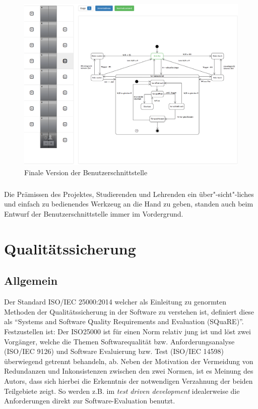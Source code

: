 \begin{figure}[h]
	\hspace*{-1.5cm}
	\includegraphics[width=1.15\textwidth]{images/UI_colorless}
	\caption{Finale Version der Benutzerschnittstelle}
	\label{UI_final}
\end{figure}

\paragraph{}
Die Prämissen des Projektes, Studierenden und Lehrenden ein über"-sicht"-liches und einfach zu bedienendes Werkzeug an die Hand zu geben, standen auch beim Entwurf der Benutzerschnittstelle immer im Vordergrund.


\chapter{Qualitätssicherung}
\label{QS}
\section{Allgemein} \label{QS:Allgemein}
Der Standard ISO/IEC 25000:2014 welcher als Einleitung zu genormten Methoden der Qualitätssicherung in der Software zu verstehen ist, definiert diese als "`Systems and Software Quality Requirements and Evaluation (SQuaRE)"'\cite[Foreword]{ISO25000:2014}. Festzustellen ist: Der ISO25000 ist für einen Norm relativ jung ist und löst zwei Vorgänger, welche die Themen Softwarequalität bzw. Anforderungsanalyse (ISO/IEC 9126) und Software Evaluierung bzw. Test (ISO/IEC 14598) überwiegend getrennt behandeln, ab. Neben der Motivation der Vermeidung von Redundanzen und Inkonsistenzen zwischen den zwei Normen, ist es Meinung des Autors, dass sich hierbei die Erkenntnis der notwendigen Verzahnung der beiden Teilgebiete zeigt. So werden z.B. im \textit{test driven development} idealerweise die Anforderungen direkt zur Software-Evaluation benutzt.

